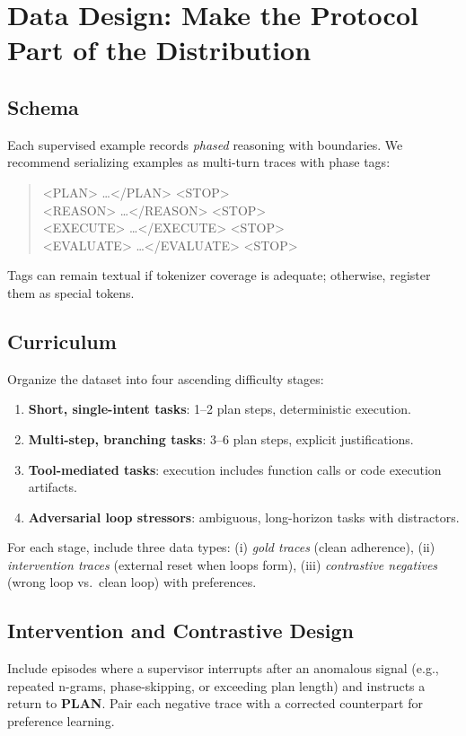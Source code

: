 \documentclass[11pt]{article}
\begin{document}
\section{Data Design: Make the Protocol Part of the Distribution}
\subsection{Schema}
Each supervised example records \emph{phased} reasoning with boundaries.
We recommend serializing examples as multi-turn traces with phase tags:
\begin{quote}\ttfamily\small
<PLAN> \ldots </PLAN> <STOP>\\
<REASON> \ldots </REASON> <STOP>\\
<EXECUTE> \ldots </EXECUTE> <STOP>\\
<EVALUATE> \ldots </EVALUATE> <STOP>
\end{quote}
Tags can remain textual if tokenizer coverage is adequate; otherwise, register them as special tokens.

\subsection{Curriculum}
Organize the dataset into four ascending difficulty stages:
\begin{enumerate}[leftmargin=2em,label=\textbf{S\arabic*}]
  \item \textbf{Short, single-intent tasks}: 1--2 plan steps, deterministic execution.
  \item \textbf{Multi-step, branching tasks}: 3--6 plan steps, explicit justifications.
  \item \textbf{Tool-mediated tasks}: execution includes function calls or code execution artifacts.
  \item \textbf{Adversarial loop stressors}: ambiguous, long-horizon tasks with distractors.
\end{enumerate}
For each stage, include three data types:
(i) \emph{gold traces} (clean adherence),
(ii) \emph{intervention traces} (external reset when loops form),
(iii) \emph{contrastive negatives} (wrong loop vs.\ clean loop) with preferences.

\subsection{Intervention and Contrastive Design}
Include episodes where a supervisor interrupts after an anomalous signal (e.g., repeated n-grams,
phase-skipping, or exceeding plan length) and instructs a return to \textbf{PLAN}.
Pair each negative trace with a corrected counterpart for preference learning.
\end{document}
